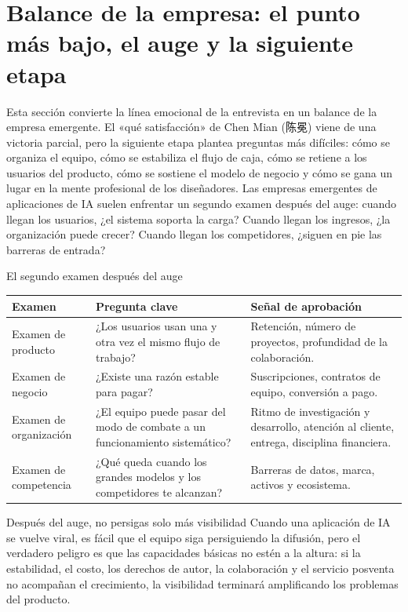 \section{Balance de la empresa: el punto más bajo, el auge y la siguiente etapa}

Esta sección convierte la línea emocional de la entrevista en un balance de la empresa emergente. El «qué satisfacción» de Chen Mian (陈冕) viene de una victoria parcial, pero la siguiente etapa plantea preguntas más difíciles: cómo se organiza el equipo, cómo se estabiliza el flujo de caja, cómo se retiene a los usuarios del producto, cómo se sostiene el modelo de negocio y cómo se gana un lugar en la mente profesional de los diseñadores. Las empresas emergentes de aplicaciones de IA suelen enfrentar un segundo examen después del auge: cuando llegan los usuarios, ¿el sistema soporta la carga? Cuando llegan los ingresos, ¿la organización puede crecer? Cuando llegan los competidores, ¿siguen en pie las barreras de entrada?

\begin{knowledgebox}{El segundo examen después del auge}
\begin{tabularx}{\textwidth}{p{}p{}X}
\toprule
Examen & Pregunta clave & Señal de aprobación \\
\midrule
Examen de producto & ¿Los usuarios usan una y otra vez el mismo flujo de trabajo? & Retención, número de proyectos, profundidad de la colaboración. \\
Examen de negocio & ¿Existe una razón estable para pagar? & Suscripciones, contratos de equipo, conversión a pago. \\
Examen de organización & ¿El equipo puede pasar del modo de combate a un funcionamiento sistemático? & Ritmo de investigación y desarrollo, atención al cliente, entrega, disciplina financiera. \\
Examen de competencia & ¿Qué queda cuando los grandes modelos y los competidores te alcanzan? & Barreras de datos, marca, activos y ecosistema. \\
\bottomrule
\end{tabularx}
\end{knowledgebox}

\begin{warningbox}{Después del auge, no persigas solo más visibilidad}
Cuando una aplicación de IA se vuelve viral, es fácil que el equipo siga persiguiendo la difusión, pero el verdadero peligro es que las capacidades básicas no estén a la altura: si la estabilidad, el costo, los derechos de autor, la colaboración y el servicio posventa no acompañan el crecimiento, la visibilidad terminará amplificando los problemas del producto.
\end{warningbox}

